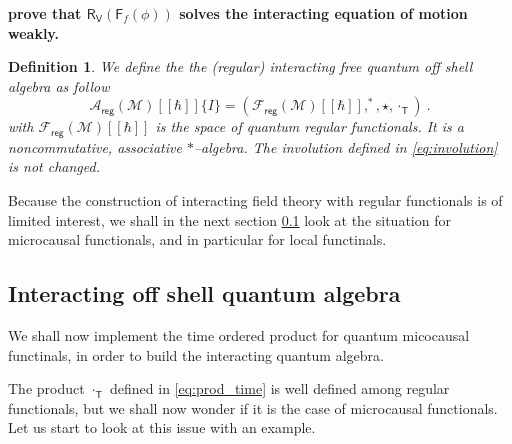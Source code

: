 \documentclass[11pt]{book}
\newcommand{\com}[1]{{\color{red}\bf #1}}
\newcommand{\hilight}[1]{\colorbox{yellow!80!black}{#1}}
\newcommand{\reg}{\mathsf{reg}}
\newcommand{\Acal}{\mathcal{A}}
\newcommand{\Fcal}{\mathcal{F}}
\newcommand{\Mcal}{\mathcal{M}}
\newcommand{\Fsf}{\mathsf{F}}
\newcommand{\Rsf}{\mathsf{R}}
\newcommand{\Tsf}{\mathsf{T}}
\newcommand{\Vsf}{\mathsf{V}}
\theoremstyle{break}
\newtheorem{definition}{Definition}[chapter]
\begin{document}
\bigskip
\noindent
\hilight{\com{prove that $\Rsf_\Vsf(\Fsf_f(\phi))$ solves the interacting equation of motion weakly.}}
\bigskip


\begin{definition}\label{def:alg_qT_reg}
We define the the (regular) interacting free quantum off shell algebra as follow
%
\begin{equation*}
\Acal_\reg(\Mcal)[[\hbar]]\{I\} = \left(\Fcal_\reg(\Mcal)[[\hbar]] , ^\ast , \star , \cdot_\Tsf \right) \ . 
\end{equation*}
%
with $\Fcal_\reg(\Mcal)[[\hbar]]$ is the space of quantum regular functionals. It is a noncommutative, associative $\ast$--algebra. The involution defined in \eqref{eq:involution} is not changed. 
\end{definition}


Because the construction of interacting field theory with regular functionals is of limited interest, we shall in the next section \ref{p:INT_Q_ALG} look at the situation for microcausal functionals, and in particular for local functinals.


\subsection{Interacting off shell quantum algebra}
\label{p:INT_Q_ALG}


We shall now implement the time ordered product for quantum micocausal functinals, in order to build the interacting quantum algebra. 


The product $\cdot_\Tsf$ defined in \eqref{eq:prod_time} is well defined among regular functionals, but we shall now wonder if it is the case of microcausal functionals. Let us start to look at this issue with an example.
\end{document}
